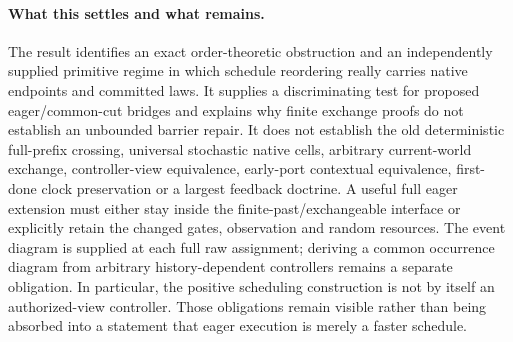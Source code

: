 \documentclass{article}
\begin{document}
\paragraph{What this settles and what remains.}
The result identifies an exact order-theoretic obstruction and an independently supplied primitive regime in which schedule reordering really carries native endpoints and committed laws. It supplies a discriminating test for proposed eager/common-cut bridges and explains why finite exchange proofs do not establish an unbounded barrier repair. It does not establish the old deterministic full-prefix crossing, universal stochastic native cells, arbitrary current-world exchange, controller-view equivalence, early-port contextual equivalence, first-done clock preservation or a largest feedback doctrine. A useful full eager extension must either stay inside the finite-past/exchangeable interface or explicitly retain the changed gates, observation and random resources. The event diagram is supplied at each full raw assignment; deriving a common occurrence diagram from arbitrary history-dependent controllers remains a separate obligation. In particular, the positive scheduling construction is not by itself an authorized-view controller. Those obligations remain visible rather than being absorbed into a statement that eager execution is merely a faster schedule.
\end{document}
